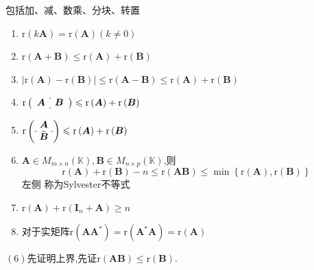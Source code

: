 \begin{formal}
\begin{theorem}[运算的秩]\label{thm:运算的秩}
包括加、减、数乘、分块、转置
\begin{enumerate}[label=\textup{(\arabic*)}]
    \item  $\mathrm{r}\left(k\bm{A}\right)
    =\mathrm{r}\left(\bm{A}\right)
    \left(k \neq 0\right)$
    \item $\mathrm{r}\left(\bm{A}+\bm{B}
    \right)\leqslant \mathrm{r}
    \left(\bm{A}\right) + \mathrm{r}
    \left(\bm{B}\right)$
    \item $\left|
        \mathrm{r}\left(\bm{A}\right)
        -
        \mathrm{r}\left(\bm{B}\right)
    \right|
    \leqslant 
    \mathrm{r}\left(\bm{A}
    -\bm{B}\right)
    \leqslant 
    \mathrm{r}\left(\bm{A}\right)+
    \mathrm{r}\left(\bm{B}\right)$
    \item $\mathrm{r}
    \left (
        \begin{array}{c:c}
            \begin{matrix}
                \bm{A}
            \end{matrix}
            &
            \begin{matrix}
                \bm{B}
            \end{matrix}
        \end{array}
    \right )\leqslant
    \mathrm{r}\left(\bm{A}\right)+
    \mathrm{r}\left(\bm{B}\right)$
    \item $\mathrm{r}
    \left ( 
    \begin{array}{c}
        \bm{A} \\
        \hdashline
        \bm{B}
    \end{array}
    \right )
    \leqslant
    \mathrm{r}\left(\bm{A}\right)+
    \mathrm{r}\left(\bm{B}\right)$
    \newpage
    \item $
    \bm{A} \in M_{m \times n}\left(
        \mathbb{K}
    \right) ,\bm{B}\in 
    M_{n \times p}
    \left(\mathbb{K}\right)$,则\[
    \mathrm{r}\left(\bm{A}\right)+
    \mathrm{r}\left(\bm{B}\right)
    - n\leqslant 
    \mathrm{r}\left(
        \bm{AB}\right)
        \leqslant 
    \min\left\{
    \mathrm{r}\left(\bm{A}\right),
    \mathrm{r}\left(\bm{B}\right)
    \right\}\]
    左侧
    称为\textup{Sylvester}不等式
    \item $\mathrm{r}\left(\bm{A}\right)
    +\mathrm{r}\left(\bm{I}_n
    +\bm{A}\right)\geqslant 
    n$
    \item 对于实矩阵$
    \mathrm{r}\left(\bm{AA}^*\right)
    =\mathrm{r}\left(\bm{A}^*\bm{A}
    \right)=\mathrm{r}\left(\bm{A}\right)
    $
\end{enumerate}
\end{theorem}
\begin{Proof}
$(6)$先证明上界,先证$\mathrm{r}\left(\bm{AB}\right)\leqslant \mathrm{r}\left(\bm{B}
\right)$.


\end{Proof}
\end{formal}
